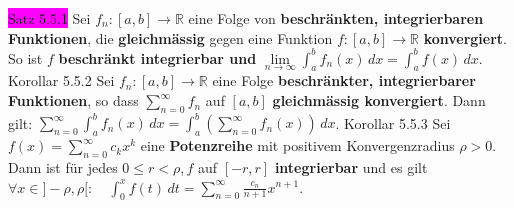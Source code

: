\documentclass[landscape, 10pt]{article}
\newcommand{\R}{\mathbb{R}}
\begin{document}
\begin{multicols}{3}
\colorbox{magenta}{Satz 5.5.1} Sei \textcolor{NavyBlue}{$f_n:[a,b]\longrightarrow\R$} 
                eine Folge von \textbf{beschränkten, integrierbaren Funktionen}, 
                die \textbf{gleichmässig} gegen 
         eine Funktion 
                \textcolor{NavyBlue}{$f:[a,b]\longrightarrow\R$} \textbf{konvergiert}.
                So ist \textcolor{NavyBlue}{$f$} \textbf{beschränkt integrierbar und} 
                \textcolor{NavyBlue}{$\lim\limits_{n\to\infty}\int_a^bf_n(x)\,dx
                =\int_a^bf(x)\,dx$}.
\colorbox{BurntOrange}{Korollar 5.5.2} Sei 
                \textcolor{NavyBlue}{$f_n:[a,b]\longrightarrow\R$} eine Folge 
                \textbf{beschränkter, integrierbarer Funktionen}, so dass 
                \textcolor{NavyBlue}{$\sum_{n=0}^\infty f_n$} auf 
                \textcolor{NavyBlue}{$[a,b]$}
         \textbf{gleichmässig konvergiert}. Dann gilt: 
                \textcolor{NavyBlue}{$\sum_{n=0}^\infty\int_a^bf_n(x)\,dx
                =\int_a^b(\sum_{n=0}^\infty f_n(x))\,dx$}. 
\colorbox{BurntOrange}{Korollar 5.5.3} Sei 
                \textcolor{NavyBlue}{$f(x)=\sum_{n=0}^\infty c_kx^k$} 
                eine \textbf{Potenzreihe} mit positivem Konvergenzradius 
                \textcolor{NavyBlue}{$\rho>0$}. Dann ist für jedes 
         \textcolor{NavyBlue}{$0\leqslant r<\rho$},\,\textcolor{NavyBlue}{$f$} 
                auf \textcolor{NavyBlue}{$[-r,r]$}
                \textbf{integrierbar} und es gilt 
                \textcolor{NavyBlue}{$\forall x\in]-\rho,\rho[:\quad
                \int_0^xf(t)\,dt=\sum_{n=0}^\infty\frac{c_n}{n+1}x^{n+1}$}.

\end{multicols}
\end{document}

